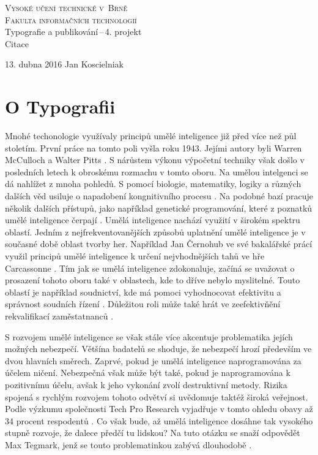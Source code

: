 \documentclass[11pt,a4paper]{article}
\begin{document}
\begin{titlepage}
\begin{center}
\Huge
\textsc{Vysoké učení technické v~Brně}\\
\huge
\textsc{Fakulta informačních technologií\\}
\LARGE
Typografie a publikování\,--\,4. projekt \\
\Huge
Citace
\end{center} 
{\Large 13. dubna 2016 \hfill
Jan Koscielniak}
\end{titlepage}
\section*{O Typografii}


Mnohé techonologie využívaly principů umělé inteligence již před více než půl stoletím.
První práce na tomto poli vyšla roku 1943.
Jejími autory byli Warren McCulloch a Walter Pitts \cite{NegnevitskyMichael2002Ai}. 
S nárůstem výkonu výpočetní techniky však došlo v posledních letech k obroskému rozmachu v tomto oboru.
Na umělou intelgenci se dá nahlížet z mnoha pohledů.
S pomocí biologie, matematiky, logiky a různých dalších věd usiluje o napadobení kongnitivního procesu \cite{RagasLudek2017Ui}. 
Na podobné bazí pracuje několik dalších přístupů, jako například genetické programování, které z poznatků umělé inteligence čerpají \cite{FITPUB11427}.
Umělá inteligence nachází využití v širokém spektru oblastí.
Jedním z nejfrekventovanějších způsobů uplatnění umělé inteligence je v současné době oblast tvorby her.
Například Jan Černohub ve své bakalářské prácí využil principů umělé inteligence k určení nejvhodnějších tahů ve hře Carcassonne \cite{CernohubJan2010Uipd}.
Tím jak se umělá inteligence zdokonaluje, začíná se uvažovat o prosazení tohoto oboru také v oblastech, kde to dříve nebylo myslitelné.
Touto oblastí je například soudnictví, kde má pomoci vyhodnocovat efektivitu a správnost soudních řízení \cite{PahAdamR2022TPoA}.
Důležitou roli může také hrát ve zeefektivňění rekvalifikací zaměstatnanců \cite{RobsonRobby2022IlAc}.


S rozvojem umělé inteligence se však stále více akcentuje problematika jejích možných nebezpečí.
Většína badatelů se shoduje, že nebezpečí hrozí především ve dvou hlavních směrech.
Zaprvé, pokud je umělá inteligence naprogramována za účelem ničení. 
Nebezpečná však může být také, pokud je naprogramována k pozitivnímu účelu, avšak k jeho vykonání zvolí destruktivní metody.
Rizika spojená s rychlým rozvojem tohoto odvětví si uvědomuje taktéž široká veřejnost.
Podle výzkumu společnosti Tech Pro Research vyjadřuje v tomto ohledu obavy až 34 procent respodentů \cite{Maddox_2015}.
Co však bude, až umělá inteligence dosáhne tak vysokého stupně rozvoje, že dalece předčí tu lidskou?
Na tuto otázku se snaží odpovědět Max Tegmark, jenž se touto problematinkou zabývá dlouhodobě \cite{TegmarkMax2020Z3:c}.


\newpage
\renewcommand{\refname}{Literatura}


\end{document}

